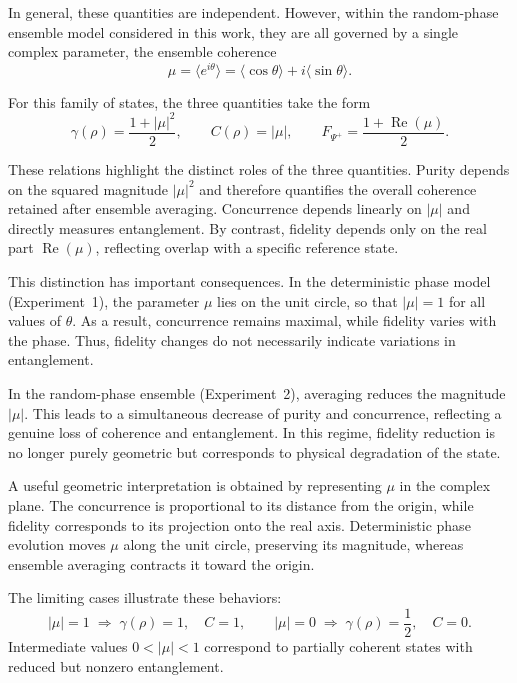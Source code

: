 \documentclass[a4paper]{article}
\begin{document}
\medskip

In general, these quantities are independent. However, within the random-phase ensemble model considered in this work, they are all governed by a single complex parameter, the ensemble coherence
\[
\mu = \langle e^{i\theta} \rangle
=
\langle \cos\theta \rangle + i \langle \sin\theta \rangle.
\]

\medskip

For this family of states, the three quantities take the form
\[
\gamma(\rho) = \frac{1 + |\mu|^2}{2}, 
\qquad
C(\rho) = |\mu|, 
\qquad
F_{\Psi^+} = \frac{1 + \operatorname{Re}(\mu)}{2}.
\]

\medskip

These relations highlight the distinct roles of the three quantities. Purity depends on the squared magnitude \( |\mu|^2 \) and therefore quantifies the overall coherence retained after ensemble averaging. Concurrence depends linearly on \( |\mu| \) and directly measures entanglement. By contrast, fidelity depends only on the real part \( \operatorname{Re}(\mu) \), reflecting overlap with a specific reference state.

\medskip

This distinction has important consequences. In the deterministic phase model (Experiment~1), the parameter \( \mu \) lies on the unit circle, so that \( |\mu| = 1 \) for all values of \( \theta \). As a result, concurrence remains maximal, while fidelity varies with the phase. Thus, fidelity changes do not necessarily indicate variations in entanglement.

\medskip

In the random-phase ensemble (Experiment~2), averaging reduces the magnitude \( |\mu| \). This leads to a simultaneous decrease of purity and concurrence, reflecting a genuine loss of coherence and entanglement. In this regime, fidelity reduction is no longer purely geometric but corresponds to physical degradation of the state.

\medskip

A useful geometric interpretation is obtained by representing \( \mu \) in the complex plane. The concurrence is proportional to its distance from the origin, while fidelity corresponds to its projection onto the real axis. Deterministic phase evolution moves \( \mu \) along the unit circle, preserving its magnitude, whereas ensemble averaging contracts it toward the origin.

\medskip

The limiting cases illustrate these behaviors:
\[
|\mu| = 1 \;\Rightarrow\; \gamma(\rho)=1, \quad C=1,
\qquad
|\mu| = 0 \;\Rightarrow\; \gamma(\rho)=\frac{1}{2}, \quad C=0.
\]
Intermediate values \( 0 < |\mu| < 1 \) correspond to partially coherent states with reduced but nonzero entanglement.
\end{document}

